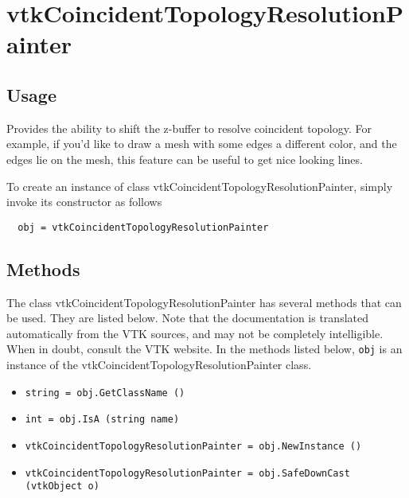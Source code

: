 \section{vtkCoincidentTopologyResolutionPainter}

\subsection{Usage}

 Provides the ability to shift the z-buffer to resolve coincident topology. 
 For example, if you'd like to draw a mesh with some edges a different color, 
 and the edges lie on the mesh, this feature can be useful to get nice 
 looking lines.

To create an instance of class vtkCoincidentTopologyResolutionPainter, simply
invoke its constructor as follows
\begin{verbatim}
  obj = vtkCoincidentTopologyResolutionPainter
\end{verbatim}
\subsection{Methods}

The class vtkCoincidentTopologyResolutionPainter has several methods that can be used.
  They are listed below.
Note that the documentation is translated automatically from the VTK sources,
and may not be completely intelligible.  When in doubt, consult the VTK website.
In the methods listed below, \verb|obj| is an instance of the vtkCoincidentTopologyResolutionPainter class.
\begin{itemize}
\item  \verb|string = obj.GetClassName ()|

\item  \verb|int = obj.IsA (string name)|

\item  \verb|vtkCoincidentTopologyResolutionPainter = obj.NewInstance ()|

\item  \verb|vtkCoincidentTopologyResolutionPainter = obj.SafeDownCast (vtkObject o)|

\end{itemize}
